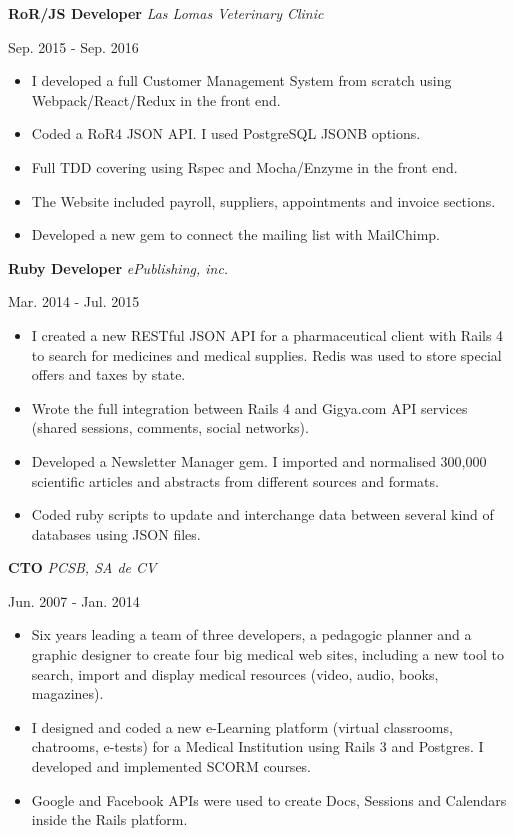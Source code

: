 \documentclass[]{k-cv}
\begin{document}
   \textbf{RoR/JS Developer} \textit{Las Lomas Veterinary Clinic}
   {\color{gray} {\small Sep. 2015 - Sep. 2016 \par}}
   \begin{itemize}
     \item I developed a full Customer Management System from scratch using Webpack/React/Redux in the front end.
     \item Coded a RoR4 JSON API. I used PostgreSQL JSONB options.
     \item Full TDD covering using Rspec and Mocha/Enzyme in the front end.
     \item The Website included payroll, suppliers, appointments and invoice sections.
     \item Developed a new gem to connect the mailing list with MailChimp.
   \end{itemize}

  \textbf{Ruby Developer}  \textit{ePublishing, inc.}
  {\color{gray} {\small Mar. 2014 - Jul. 2015 \par}}
   \begin{itemize}
     \item I created a new RESTful JSON API for a pharmaceutical client with Rails 4 to
           search for medicines and medical supplies. Redis was used to store
           special offers and taxes by state.
     \item Wrote the full integration between Rails 4 and Gigya.com API services (shared
           sessions, comments, social networks).
     \item Developed a Newsletter Manager gem. I imported and normalised 300,000
           scientific articles and abstracts from different sources and formats.
     \item Coded ruby scripts to update and interchange data between several kind of
           databases using JSON files.
  \end{itemize}

   \textbf{CTO} \textit{PCSB, SA de CV}
   {\color{gray} {\small Jun. 2007 - Jan. 2014 \par}}
   \begin{itemize}
     \item Six years leading a team of three developers, a pedagogic planner and a
           graphic designer to create four big medical web sites, including a new tool to
           search, import and display medical resources (video, audio, books, magazines).
     \item I designed and coded a new e-Learning platform (virtual classrooms,
           chatrooms, e-tests) for a Medical Institution using Rails 3 and Postgres. I
           developed and implemented SCORM courses.
     \item Google and Facebook APIs were used to create Docs, Sessions and Calendars
           inside the Rails platform.
   \end{itemize}
\end{document}
